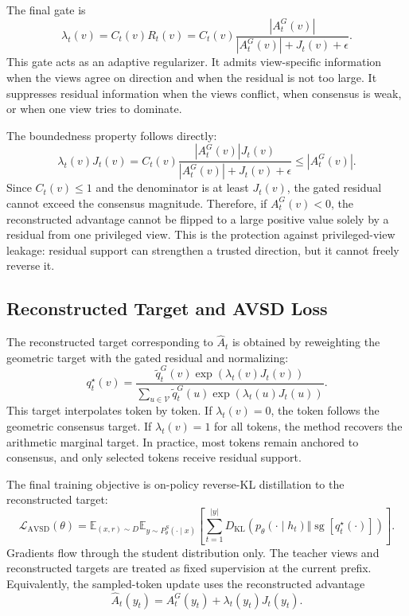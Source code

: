 The final gate is
\[
    \lambda_t(v)
    =
    C_t(v)R_t(v)
    =
    C_t(v)
    \frac{|A_t^G(v)|}{|A_t^G(v)|+J_t(v)+\epsilon}.
    \label{eq:avsd-gate}
\]
This gate acts as an adaptive regularizer. It admits view-specific information when the views agree on direction and when the residual is not too large. It suppresses residual information when the views conflict, when consensus is weak, or when one view tries to dominate.

The boundedness property follows directly:
\[
    \lambda_t(v)J_t(v)
    =
    C_t(v)\frac{|A_t^G(v)|J_t(v)}
    {|A_t^G(v)|+J_t(v)+\epsilon}
    \leq |A_t^G(v)|.
\]
Since $C_t(v)\leq 1$ and the denominator is at least $J_t(v)$, the gated residual cannot exceed the consensus magnitude. Therefore, if $A_t^G(v)<0$, the reconstructed advantage cannot be flipped to a large positive value solely by a residual from one privileged view. This is the protection against privileged-view leakage: residual support can strengthen a trusted direction, but it cannot freely reverse it.

\subsection{Reconstructed Target and AVSD Loss}

The reconstructed target corresponding to $\widehat{A}_t$ is obtained by reweighting the geometric target with the gated residual and normalizing:
\[
    q_t^{\star}(v)
    =
    \frac{\widetilde{q}_t^G(v)\exp(\lambda_t(v)J_t(v))}
    {\sum_{u\in\mathcal{V}}\widetilde{q}_t^G(u)\exp(\lambda_t(u)J_t(u))}.
\]
This target interpolates token by token. If $\lambda_t(v)=0$, the token follows the geometric consensus target. If $\lambda_t(v)=1$ for all tokens, the method recovers the arithmetic marginal target. In practice, most tokens remain anchored to consensus, and only selected tokens receive residual support.

The final training objective is on-policy reverse-KL distillation to the reconstructed target:
\[
    \mathcal{L}_{\mathrm{AVSD}}(\theta)
    =
    \mathbb{E}_{(x,r)\sim D}
    \mathbb{E}_{y\sim P_{\theta}^{S}(\cdot\mid x)}
    \left[
    \sum_{t=1}^{|y|}
    D_{\mathrm{KL}}\left(
    p_{\theta}(\cdot\mid h_t)
    \Vert
    \operatorname{sg}[q_t^{\star}(\cdot)]
    \right)
    \right].
    \label{eq:avsd-loss}
\]
Gradients flow through the student distribution only. The teacher views and reconstructed targets are treated as fixed supervision at the current prefix. Equivalently, the sampled-token update uses the reconstructed advantage
\[
    \widehat{A}_t(y_t)=A_t^G(y_t)+\lambda_t(y_t)J_t(y_t).
\]

